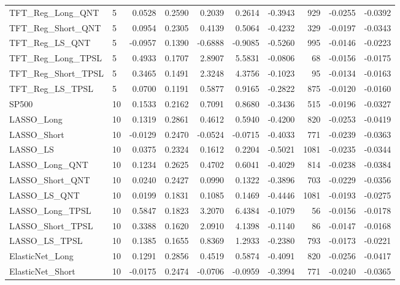 \begin{tabular}{llrrrrrrrr}
\cline{1-10}
TFT\_Reg\_Long\_QNT & 5 & 0.0528 & 0.2590 & 0.2039 & 0.2614 & -0.3943 & 929 & -0.0255 & -0.0392 \\
\cline{1-10}
TFT\_Reg\_Short\_QNT & 5 & 0.0954 & 0.2305 & 0.4139 & 0.5064 & -0.4232 & 329 & -0.0197 & -0.0343 \\
\cline{1-10}
TFT\_Reg\_LS\_QNT & 5 & -0.0957 & 0.1390 & -0.6888 & -0.9085 & -0.5260 & 995 & -0.0146 & -0.0223 \\
\cline{1-10}
TFT\_Reg\_Long\_TPSL & 5 & 0.4933 & 0.1707 & 2.8907 & 5.5831 & -0.0806 & 68 & -0.0156 & -0.0175 \\
\cline{1-10}
TFT\_Reg\_Short\_TPSL & 5 & 0.3465 & 0.1491 & 2.3248 & 4.3756 & -0.1023 & 95 & -0.0134 & -0.0163 \\
\cline{1-10}
TFT\_Reg\_LS\_TPSL & 5 & 0.0700 & 0.1191 & 0.5877 & 0.9165 & -0.2822 & 875 & -0.0120 & -0.0160 \\
\cline{1-10}
SP500 & 10 & 0.1533 & 0.2162 & 0.7091 & 0.8680 & -0.3436 & 515 & -0.0196 & -0.0327 \\
\cline{1-10}
LASSO\_Long & 10 & 0.1319 & 0.2861 & 0.4612 & 0.5940 & -0.4200 & 820 & -0.0253 & -0.0419 \\
\cline{1-10}
LASSO\_Short & 10 & -0.0129 & 0.2470 & -0.0524 & -0.0715 & -0.4033 & 771 & -0.0239 & -0.0363 \\
\cline{1-10}
LASSO\_LS & 10 & 0.0375 & 0.2324 & 0.1612 & 0.2204 & -0.5021 & 1081 & -0.0235 & -0.0344 \\
\cline{1-10}
LASSO\_Long\_QNT & 10 & 0.1234 & 0.2625 & 0.4702 & 0.6041 & -0.4029 & 814 & -0.0238 & -0.0384 \\
\cline{1-10}
LASSO\_Short\_QNT & 10 & 0.0240 & 0.2427 & 0.0990 & 0.1322 & -0.3896 & 703 & -0.0229 & -0.0356 \\
\cline{1-10}
LASSO\_LS\_QNT & 10 & 0.0199 & 0.1831 & 0.1085 & 0.1469 & -0.4446 & 1081 & -0.0193 & -0.0275 \\
\cline{1-10}
LASSO\_Long\_TPSL & 10 & 0.5847 & 0.1823 & 3.2070 & 6.4384 & -0.1079 & 56 & -0.0156 & -0.0178 \\
\cline{1-10}
LASSO\_Short\_TPSL & 10 & 0.3388 & 0.1620 & 2.0910 & 4.1398 & -0.1140 & 86 & -0.0147 & -0.0168 \\
\cline{1-10}
LASSO\_LS\_TPSL & 10 & 0.1385 & 0.1655 & 0.8369 & 1.2933 & -0.2380 & 793 & -0.0173 & -0.0221 \\
\cline{1-10}
ElasticNet\_Long & 10 & 0.1291 & 0.2856 & 0.4519 & 0.5874 & -0.4091 & 820 & -0.0256 & -0.0417 \\
\cline{1-10}
ElasticNet\_Short & 10 & -0.0175 & 0.2474 & -0.0706 & -0.0959 & -0.3994 & 771 & -0.0240 & -0.0365 \\

\end{tabular}
